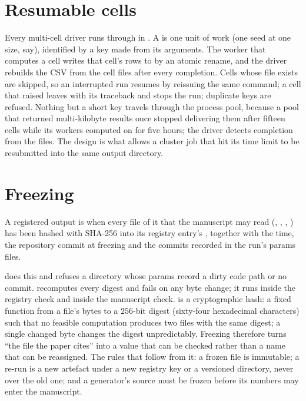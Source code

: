 \section{Resumable cells}
\label{sec:cells}

Every multi-cell driver runs through  in .
A  is one unit of work (one seed at one size, say), identified by a key made
from its arguments. The worker that computes a cell writes that cell's rows to
 by an atomic rename, and the driver
rebuilds the CSV from the cell files after every completion. Cells whose file exists are
skipped, so an interrupted run resumes by reissuing the same command; a cell that raised
leaves  with its traceback and stops the run; duplicate keys are
refused. Nothing but a short key travels through the process pool, because a pool that
returned multi-kilobyte results once stopped delivering them after fifteen cells while
its workers computed on for five hours; the driver detects completion from the files.
The design is what allows a cluster job that hit its time limit to be resubmitted into
the same output directory.

\section{Freezing}
\label{sec:freeze}

\begin{definition}
\label{def:frozen}
A registered output is  when every file of it that the manuscript may read
(, , , ) has
been hashed with SHA-256 into its registry entry's , together with
the time, the repository commit at freezing and the commits recorded in the run's params
files.
\end{definition}

 does this and refuses a directory whose params record a
dirty code path or no commit.  recomputes every digest and
fails on any byte change; it runs inside the registry check and inside the manuscript
check.  is a cryptographic hash: a fixed function from a file's bytes to
a $256$-bit digest (sixty-four hexadecimal characters) such that no feasible computation
produces two files with the same digest; a single changed byte changes the digest
unpredictably. Freezing therefore turns ``the file the paper cites'' into a value that
can be checked rather than a name that can be reassigned. The rules that follow from it:
a frozen file is immutable; a re-run is a new artefact under a new registry key or a
versioned directory, never over the old one; and a generator's source must be frozen
before its numbers may enter the manuscript.

